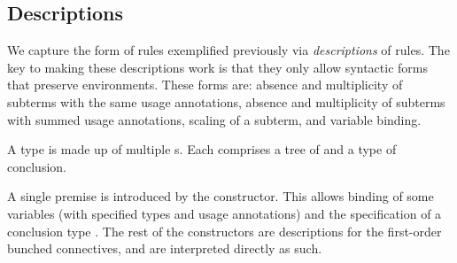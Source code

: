 \subsection{Descriptions}

We capture the form of rules exemplified previously via
\emph{descriptions} of rules.
The key to making these descriptions work is that they only allow syntactic
forms that preserve environments.
These forms are: absence and multiplicity of subterms with the same usage
annotations, absence and multiplicity of subterms with summed usage annotations,
scaling of a subterm, and variable binding.

A type  is made up of multiple s.
Each  comprises a tree of  and a type
of conclusion.


A single premise is introduced by the
 constructor.
This allows binding of some variables \AgdaBound{$\Gamma$} (with specified
types and usage annotations) and the specification of a conclusion type
.
The rest of the constructors are descriptions for the first-order bunched
connectives, and are interpreted directly as such.



